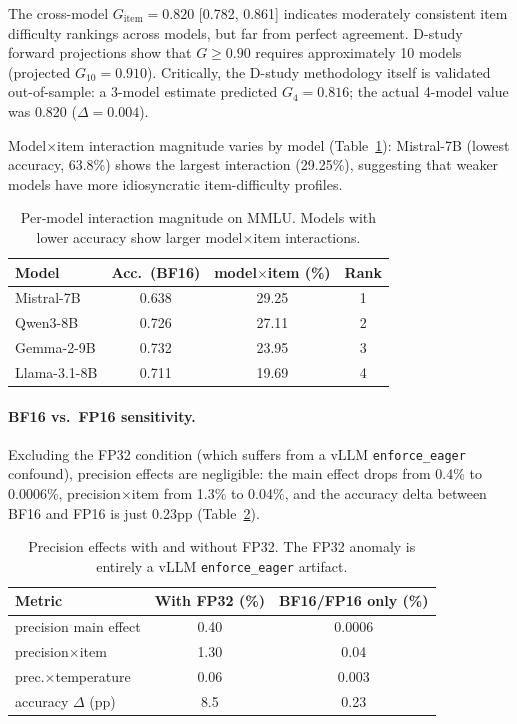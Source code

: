 \documentclass[11pt,a4paper]{article}
\newcommand{\Gcoeff}{\ensuremath{G}}
\begin{document}
The cross-model $\Gcoeff_\text{item} = 0.820$ [0.782, 0.861] indicates moderately consistent item difficulty rankings across models, but far from perfect agreement.
D-study forward projections show that $\Gcoeff\geq0.90$ requires approximately 10 models (projected $\Gcoeff_{10}=0.910$).
Critically, the D-study methodology itself is validated out-of-sample: a 3-model estimate predicted $\Gcoeff_4=0.816$; the actual 4-model value was 0.820 ($\Delta=0.004$).

Model$\times$item interaction magnitude varies by model (Table~\ref{tab:permodel}): Mistral-7B (lowest accuracy, 63.8\%) shows the largest interaction (29.25\%), suggesting that weaker models have more idiosyncratic item-difficulty profiles.

\begin{table}[t]
\centering
\caption{Per-model interaction magnitude on MMLU. Models with lower accuracy show larger model$\times$item interactions.}
\label{tab:permodel}
\small
\begin{tabular}{lccc}
\toprule
\textbf{Model} & \textbf{Acc.\ (BF16)} & \textbf{model$\times$item (\%)} & \textbf{Rank} \\
\midrule
Mistral-7B     & 0.638 & 29.25 & 1 \\
Qwen3-8B       & 0.726 & 27.11 & 2 \\
Gemma-2-9B     & 0.732 & 23.95 & 3 \\
Llama-3.1-8B   & 0.711 & 19.69 & 4 \\
\bottomrule
\end{tabular}
\end{table}

\paragraph{BF16 vs.\ FP16 sensitivity.}
Excluding the FP32 condition (which suffers from a vLLM \texttt{enforce\_eager} confound), precision effects are negligible: the main effect drops from 0.4\% to 0.0006\%, precision$\times$item from 1.3\% to 0.04\%, and the accuracy delta between BF16 and FP16 is just 0.23pp (Table~\ref{tab:bf16fp16}).

\begin{table}[t]
\centering
\caption{Precision effects with and without FP32. The FP32 anomaly is entirely a vLLM \texttt{enforce\_eager} artifact.}
\label{tab:bf16fp16}
\small
\begin{tabular}{lcc}
\toprule
\textbf{Metric} & \textbf{With FP32 (\%)} & \textbf{BF16/FP16 only (\%)} \\
\midrule
precision main effect & 0.40    & 0.0006 \\
precision$\times$item     & 1.30    & 0.04 \\
prec.$\times$temperature  & 0.06    & 0.003 \\
accuracy $\Delta$ (pp)    & 8.5     & 0.23 \\
\bottomrule
\end{tabular}
\end{table}
\end{document}
